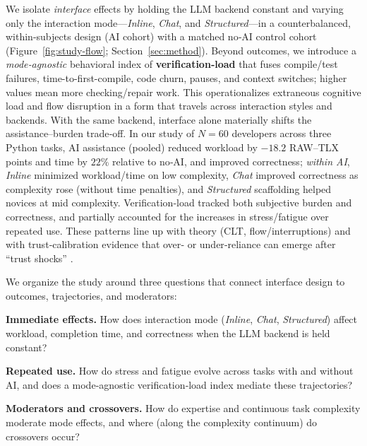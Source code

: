 \documentclass[sigconf]{acmart}
\begin{document}
We isolate \emph{interface} effects by holding the LLM backend constant and varying only the interaction mode—\emph{Inline}, \emph{Chat}, and \emph{Structured}—in a counterbalanced, within-subjects design (AI cohort) with a matched no‑AI control cohort (Figure~\ref{fig:study-flow}; Section~\ref{sec:method}). Beyond outcomes, we introduce a \emph{mode‑agnostic} behavioral index of \textbf{verification‑load} that fuses compile/test failures, time-to-first-compile, code churn, pauses, and context switches; higher values mean more checking/repair work. This operationalizes extraneous cognitive load and flow disruption in a form that travels across interaction styles and backends. With the same backend, interface alone materially shifts the assistance–burden trade‑off. In our study of $N{=}60$ developers across three Python tasks, AI assistance (pooled) reduced workload by $-18.2$ RAW–TLX points and time by $22\%$ relative to no‑AI, and improved correctness; \emph{within AI}, \emph{Inline} minimized workload/time on low complexity, \emph{Chat} improved correctness as complexity rose (without time penalties), and \emph{Structured} scaffolding helped novices at mid complexity. Verification‑load tracked both subjective burden and correctness, and partially accounted for the increases in stress/fatigue over repeated use. These patterns line up with theory (CLT, flow/interruptions) and with trust‑calibration evidence that over‑ or under‑reliance can emerge after “trust shocks” \cite{parasuraman1997humans,lee2004trust,yin2019understanding}.

We organize the study around three questions that connect interface design to outcomes, trajectories, and moderators:
\begin{description}[leftmargin=1.5em,itemsep=0.2em,topsep=0.2em]
  \item[\textbf{RQ1}] \textbf{Immediate effects.} How does interaction mode (\emph{Inline}, \emph{Chat}, \emph{Structured}) affect workload, completion time, and correctness when the LLM backend is held constant?
  \item[\textbf{RQ2}] \textbf{Repeated use.} How do stress and fatigue evolve across tasks with and without AI, and does a mode‑agnostic verification‑load index mediate these trajectories?
  \item[\textbf{RQ3}] \textbf{Moderators and crossovers.} How do expertise and continuous task complexity moderate mode effects, and where (along the complexity continuum) do crossovers occur?
\end{description}
\end{document}
